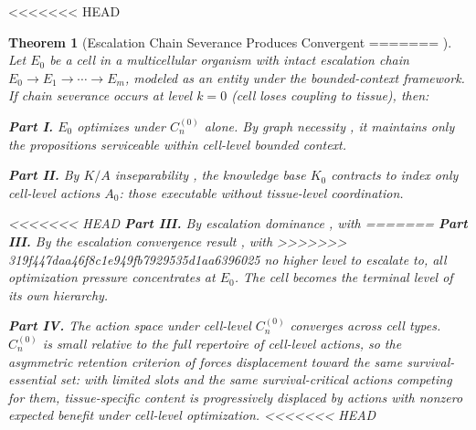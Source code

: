 \documentclass[11pt]{article}
\newtheorem{theorem}{Theorem}
\newtheorem{proposition}[theorem]{Proposition}
\theoremstyle{definition}
\theoremstyle{remark}
\begin{document}
<<<<<<< HEAD
\begin{theorem}[Escalation Chain Severance Produces Convergent
=======
\begin{proposition}[Escalation Chain Severance Produces Convergent
>>>>>>> 319f447daa46f8c1e949fb7929535d1aa6396025
Malignancy]
\label{thm:cancer}
Let $E_0$ be a cell in a multicellular organism with intact
escalation chain $E_0 \to E_1 \to \cdots \to E_m$, modeled as an
entity under the bounded-context framework. If chain severance
occurs at level $k = 0$ (cell loses coupling to tissue), then:

\textbf{Part I.} $E_0$ optimizes under $C_n^{(0)}$ alone.
By graph necessity \cite{McCarthy2026a}, it maintains only the
propositions serviceable within cell-level bounded context.

\textbf{Part II.} By $K/A$ inseparability \cite{McCarthy2026c}, the
knowledge base $K_0$ contracts to index only cell-level actions
$A_0$: those executable without tissue-level coordination.

<<<<<<< HEAD
\textbf{Part III.} By escalation dominance \cite{McCarthy2026b}, with
=======
\textbf{Part III.} By the escalation convergence result \cite{McCarthy2026b}, with
>>>>>>> 319f447daa46f8c1e949fb7929535d1aa6396025
no higher level to escalate to, all optimization pressure concentrates
at $E_0$. The cell becomes the terminal level of its own hierarchy.

\textbf{Part IV.} The action space under cell-level $C_n^{(0)}$
converges across cell types. $C_n^{(0)}$ is small relative to the
full repertoire of cell-level actions, so the asymmetric retention
criterion of \cite{McCarthy2026c} forces displacement toward the
same survival-essential set: with limited slots and the same
survival-critical actions competing for them, tissue-specific content
is progressively displaced by actions with nonzero expected benefit
under cell-level optimization.
<<<<<<< HEAD
\end{theorem}
\end{document}
